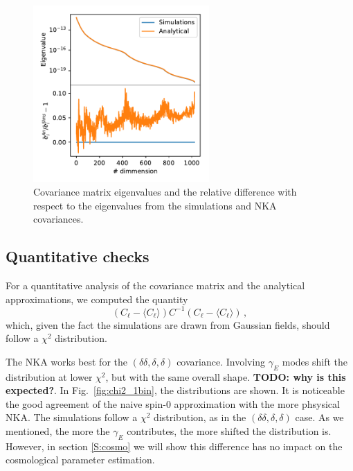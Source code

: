 \documentclass[a4paper,11pt]{article}
\newcommand{\todo}[1]{{\bf TODO: #1}}
\newcommand{\cl}{C_\ell}
\begin{document}
\begin{figure}[htb]
  \centering
  \includegraphics[width=0.6\textwidth]{./figures/run_sph_2b_NKA_TTTEEE_reldev_eigval_1stbin.pdf}
  \caption{Covariance matrix eigenvalues and the relative difference with
    respect to the eigenvalues from the simulations and NKA covariances.}
  \label{fig:eigv_1bin}
\end{figure}

\subsection{Quantitative checks}

For a quantitative analysis of the covariance matrix and the analytical
approximations, we computed the quantity 
\begin{equation}
  (\cl - \langle \cl \rangle )C^{-1} (\cl - \langle \cl \rangle)\,,
  \label{eq:chi2-def}
\end{equation}
which, given the fact the simulations are drawn from Gaussian fields, should
follow a $\chi^2$ distribution. 

The NKA works best for the $(\delta \delta, \delta, \delta)$ covariance.
Involving $\gamma_E$ modes shift the distribution at lower $\chi^2$, but with
the same overall shape. \todo{why is this expected?}. In
Fig.~\ref{fig:chi2_1bin}, the distributions are shown. It is noticeable the
good agreement of the naive spin-0 approximation with the more phsysical NKA.
The simulations follow a $\chi^2$ distribution, as in the $(\delta \delta,
\delta, \delta)$ case. As we mentioned, the more the $\gamma_E$ contributes,
the more shifted the distribution is. However, in section \ref{S:cosmo} we
will show this difference has no impact on the cosmological parameter
estimation.
\end{document}
